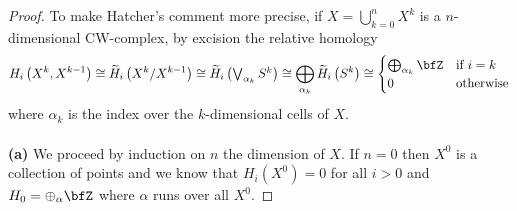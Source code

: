 \begin{proof}
To make Hatcher's comment more precise, if $X=\bigcup_{k=0}^n X^k$ is a
$n$-dimensional CW-complex, by excision the relative homology
\begin{equation}
\label{eq:hw-4-excision-wedgesum-k-spheres}
H_i\left(X^k,X^{k-1}\right)\cong
\widetilde H_i\left(X^k/X^{k-1}\right)
\cong
\widetilde H_i\left(\textstyle{\bigvee_{\alpha_k} S^k}\right)
\cong
\bigoplus_{\alpha_k}\widetilde H_i\left(S^k\right)
\cong
\begin{cases}
\bigoplus_{\alpha_k}\bfZ&\text{if $i=k$}\\
0&\text{otherwise}
\end{cases}
\end{equation}
where $\alpha_k$ is the index over the $k$-dimensional cells of $X$.
\\\\
\textbf{(a)} We proceed by induction on $n$ the dimension of $X$. If $n=0$
then $X^0$ is a collection of points and we know that $H_i(X^0)=0$ for all
$i>0$ and $H_0=\oplus_\alpha\bfZ$ where $\alpha$ runs over all $X^0$.


\end{proof}
